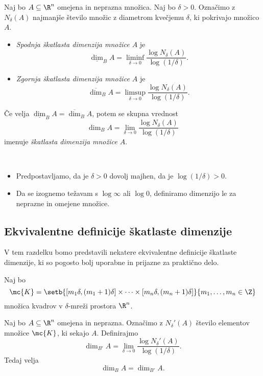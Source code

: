 \begin{definicija}
    Naj bo \(A \subseteq \R^n\) omejena in neprazna množica. Naj bo \(\delta > 0\). Označimo z \(N_\delta(A)\) najmanjše število množic z diametrom kvečjemu \(\delta\), ki pokrivajo množico \(A\).
    \begin{itemize}
        \item \emph{Spodnja škatlasta dimenzija množice \(A\)} je 
        \[
        \underline{\dim}_B A = \liminf_{\delta \to 0} \frac{\log N_\delta(A)}{\log(1/\delta)}.
        \]
        \item \emph{Zgornja škatlasta dimenzija množice \(A\)} je 
        \[
        \overline{\dim}_B A = \limsup_{\delta \to 0} \frac{\log N_\delta(A)}{\log(1/\delta)}.
        \]        
    \end{itemize}
    Če velja \(\underline{\dim}_B A = \overline{\dim}_B A\), potem se skupna vrednost
    \[
    \dim_B A = \lim_{\delta \to 0} \frac{\log N_\delta(A)}{\log(1/\delta)}
    \] 
    imenuje \emph{škatlasta dimenzija množice \(A\)}.
\end{definicija}

\begin{opomba} \ 
    \begin{itemize}
        \item Predpostavljamo, da je \(\delta > 0\) dovolj majhen, da je \(\log(1/\delta) > 0\).
        \item Da se izognemo težavam s \(\log \infty\) ali \(\log 0\), definiramo dimenzijo le za neprazne in omejene množice.
    \end{itemize}
\end{opomba}

\subsection{Ekvivalentne definicije škatlaste dimenzije}
V tem razdelku bomo predstavili nekatere ekvivalentne definicije škatlaste dimenzije, ki so pogosto bolj uporabne in prijazne za praktično delo.

Naj bo 
\[\mc{K} = \setb{[m_1\delta, (m_1 + 1)\delta] \times \cdots \times [m_n\delta, (m_n + 1)\delta]}{m_1, \ldots, m_n \in \Z}\]
množica kvadrov v \(\delta\)-mreži prostora \(\R^n\). 

\begin{trditev}
    Naj bo \(A \subseteq \R^n\) omejena in neprazna. Označimo z \(N_\delta'(A)\) število elementov množice \(\mc{K}\), ki sekajo \(A\). Definirajmo
    \[
    \dim_{B'} A = \lim_{\delta \to 0} \frac{\log N_\delta'(A)}{\log(1/\delta)}.
    \]
    Tedaj velja
    \[
    \dim_B A = \dim_{B'} A.
    \] 
\end{trditev}

